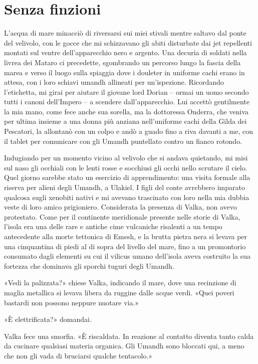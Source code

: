 \chapter{Senza finzioni}

L'acqua di mare minacciò di riversarsi sui miei stivali mentre saltavo
dal ponte del velivolo, con le gocce che mi schizzavano gli abiti
disturbate dai jet repellenti montati sul ventre dell'apparecchio nero e
argento. Una decuria di soldati nella livrea dei Mataro ci precedette,
sgombrando un percorso lungo la fascia della marea e verso il luogo
sulla spiaggia dove i douleter in uniforme cachi erano in attesa, con i
loro schiavi umandh allineati per un'ispezione. Ricordando l'etichetta,
mi girai per aiutare il giovane lord Dorian -- ormai un uomo secondo
tutti i canoni dell'Impero -- a scendere dall'apparecchio. Lui accettò
gentilmente la mia mano, come fece anche sua sorella, ma la dottoressa
Onderra, che veniva per ultima insieme a una donna più anziana
nell'uniforme cachi della Gilda dei Pescatori, la allontanò con un colpo
e andò a guado fino a riva davanti a me, con il tablet per comunicare
con gli Umandh puntellato contro un fianco rotondo.

Indugiando per un momento vicino al velivolo che si andava quietando, mi
misi sul naso gli occhiali con le lenti rosse e socchiusi gli occhi
nello scrutare il cielo. Quel giorno sarebbe stato un esercizio di
apprendimento: una visita formale alla riserva per alieni degli Umandh,
a Ulakiel. I figli del conte avrebbero imparato qualcosa sugli xenobiti
nativi e mi avevano trascinato con loro nella mia dubbia veste di loro
amico prigioniero. Considerata la presenza di Valka, non avevo
protestato. Come per il continente meridionale presente nelle storie di
Valka, l'isola era una delle rare e antiche cime vulcaniche risalenti a
un tempo antecedente alla morte {tettonica} di Emesh, e la brutta pietra
nera si levava per una cinquantina di piedi al di sopra del livello del
mare, fino a un promontorio consumato dagli elementi su cui il vilicus
umano dell'isola aveva costruito la sua fortezza che dominava gli
sporchi tuguri degli Umandh.

«Vedi la palizzata?» chiese Valka, indicando il mare, dove una
recinzione di maglia metallica si levava libera da ruggine dalle acque
verdi. «Quei poveri bastardi non possono neppure nuotare via.»

«È elettrificata?» domandai.

Valka fece una smorfia. «È riscaldata. In reazione al contatto diventa
tanto calda da cucinare qualsiasi materia organica. Gli Umandh sono
bloccati qui, a meno che non gli vada di bruciarsi qualche tentacolo.»


